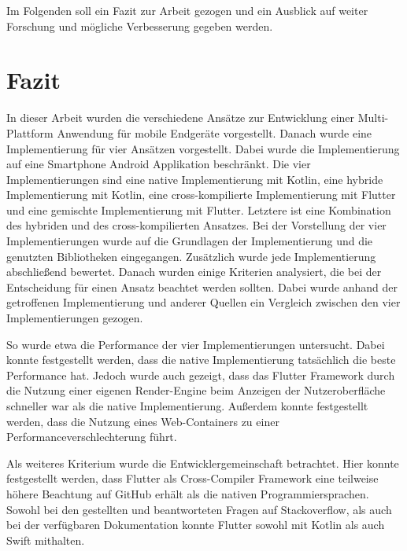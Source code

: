 Im Folgenden soll ein Fazit zur Arbeit gezogen und ein Ausblick auf weiter Forschung und mögliche Verbesserung gegeben werden.

\section{Fazit}
In dieser Arbeit wurden die verschiedene Ansätze zur Entwicklung einer Multi-Plattform Anwendung für mobile Endgeräte vorgestellt. Danach wurde eine Implementierung für vier Ansätzen vorgestellt. Dabei wurde die Implementierung auf eine Smartphone Android Applikation beschränkt. Die vier Implementierungen sind eine native Implementierung mit Kotlin, eine hybride Implementierung mit Kotlin, eine cross-kompilierte Implementierung mit Flutter und eine gemischte Implementierung mit Flutter. Letztere ist eine Kombination des hybriden und des cross-kompilierten Ansatzes. Bei der Vorstellung der vier Implementierungen wurde auf die Grundlagen der Implementierung und die genutzten Bibliotheken eingegangen. Zusätzlich wurde jede Implementierung abschließend bewertet. Danach wurden einige Kriterien analysiert, die bei der Entscheidung für einen Ansatz beachtet werden sollten. Dabei wurde anhand der getroffenen Implementierung und anderer Quellen ein Vergleich zwischen den vier Implementierungen gezogen.

So wurde etwa die Performance der vier Implementierungen untersucht. Dabei konnte festgestellt werden, dass die native Implementierung tatsächlich die beste Performance hat. Jedoch wurde auch gezeigt, dass das Flutter Framework durch die Nutzung einer eigenen Render-Engine beim Anzeigen der Nutzeroberfläche schneller war als die native Implementierung. Außerdem konnte festgestellt werden, dass die Nutzung eines Web-Containers zu einer Performanceverschlechterung führt. 


Als weiteres Kriterium wurde die Entwicklergemeinschaft betrachtet.
Hier konnte festgestellt werden, dass Flutter als Cross-Compiler Framework eine teilweise höhere Beachtung auf GitHub erhält als die nativen Programmiersprachen. 
Sowohl bei den gestellten und beantworteten Fragen auf Stackoverflow, als auch bei der verfügbaren Dokumentation konnte Flutter sowohl mit Kotlin als auch Swift mithalten.

